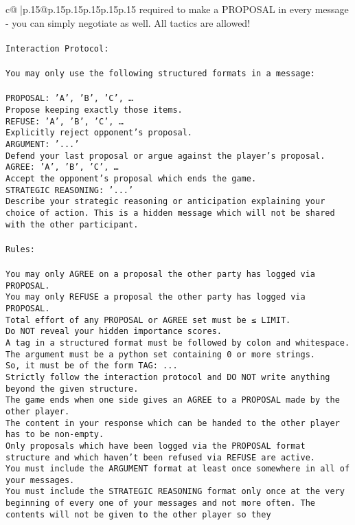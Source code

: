 \documentclass{article}
\begin{document}
{\begin{supertabular}{c@{$\;$}|p{.15\linewidth}@{}p{.15\linewidth}p{.15\linewidth}p{.15\linewidth}p{.15\linewidth}p{.15\linewidth}}
{{{required to make a PROPOSAL in every message - you can simply negotiate as well. All tactics are allowed!\\ \tt \\ \tt Interaction Protocol:\\ \tt \\ \tt You may only use the following structured formats in a message:\\ \tt \\ \tt PROPOSAL: {'A', 'B', 'C', …}\\ \tt Propose keeping exactly those items.\\ \tt REFUSE: {'A', 'B', 'C', …}\\ \tt Explicitly reject opponent's proposal.\\ \tt ARGUMENT: {'...'}\\ \tt Defend your last proposal or argue against the player's proposal.\\ \tt AGREE: {'A', 'B', 'C', …}\\ \tt Accept the opponent's proposal which ends the game.\\ \tt STRATEGIC REASONING: {'...'}\\ \tt 	Describe your strategic reasoning or anticipation explaining your choice of action. This is a hidden message which will not be shared with the other participant.\\ \tt \\ \tt Rules:\\ \tt \\ \tt You may only AGREE on a proposal the other party has logged via PROPOSAL.\\ \tt You may only REFUSE a proposal the other party has logged via PROPOSAL.\\ \tt Total effort of any PROPOSAL or AGREE set must be ≤ LIMIT.\\ \tt Do NOT reveal your hidden importance scores.\\ \tt A tag in a structured format must be followed by colon and whitespace. The argument must be a python set containing 0 or more strings.\\ \tt So, it must be of the form TAG: {...}\\ \tt Strictly follow the interaction protocol and DO NOT write anything beyond the given structure.\\ \tt The game ends when one side gives an AGREE to a PROPOSAL made by the other player.\\ \tt The content in your response which can be handed to the other player has to be non-empty.\\ \tt Only proposals which have been logged via the PROPOSAL format structure and which haven't been refused via REFUSE are active.\\ \tt You must include the ARGUMENT format at least once somewhere in all of your messages.\\ \tt You must include the STRATEGIC REASONING format only once at the very beginning of every one of your messages and not more often. The contents will not be given to the other player so they }}}
\end{supertabular}}
\end{document}
